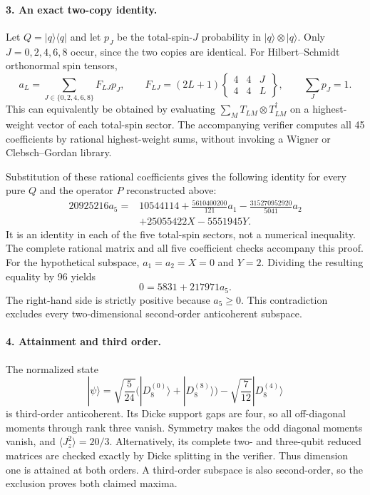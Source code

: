\documentclass[11pt]{article}
\begin{document}
\paragraph{3. An exact two-copy identity.}
Let $Q=|q\rangle\langle q|$ and let $p_J$ be the total-spin-$J$ probability in $|q\rangle\otimes|q\rangle$. Only $J=0,2,4,6,8$ occur, since the two copies are identical. For Hilbert--Schmidt orthonormal spin tensors,
\[
 a_L=\sum_{J\in\{0,2,4,6,8\}}F_{LJ}p_J,
 \qquad
 F_{LJ}=(2L+1)
 \begin{Bmatrix}4&4&J\\4&4&L\end{Bmatrix},
 \qquad \sum_Jp_J=1.
\]
This can equivalently be obtained by evaluating
$\sum_M T_{LM}\otimes T_{LM}^\dagger$ on a highest-weight vector of each total-spin sector. The accompanying verifier computes all 45 coefficients by rational highest-weight sums, without invoking a Wigner or Clebsch--Gordan library.

Substitution of these rational coefficients gives the following identity for every pure $Q$ and the operator $P$ reconstructed above:
\begin{align*}
20925216a_5={}&10544114
 +\frac{5610400200}{121}a_1
 -\frac{315270952920}{5041}a_2\\
 &+25055422X-5551945Y.
\end{align*}
It is an identity in each of the five total-spin sectors, not a numerical inequality. The complete rational matrix and all five coefficient checks accompany this proof.
For the hypothetical subspace, $a_1=a_2=X=0$ and $Y=2$. Dividing the resulting equality by 96 yields
\[
 \boxed{\quad 0=5831+217971a_5.\quad}
\]
The right-hand side is strictly positive because $a_5\ge0$. This contradiction excludes every two-dimensional second-order anticoherent subspace.

\paragraph{4. Attainment and third order.}
The normalized state
\[
 |\psi\rangle=\sqrt{\frac5{24}}
 \bigl(|D_8^{(0)}\rangle+|D_8^{(8)}\rangle\bigr)
 -\sqrt{\frac7{12}}|D_8^{(4)}\rangle
\]
is third-order anticoherent. Its Dicke support gaps are four, so all off-diagonal moments through rank three vanish. Symmetry makes the odd diagonal moments vanish, and
$\langle J_z^2\rangle=20/3$. Alternatively, its complete two- and three-qubit reduced matrices are checked exactly by Dicke splitting in the verifier.
Thus dimension one is attained at both orders. A third-order subspace is also second-order, so the exclusion proves both claimed maxima.
\end{document}
